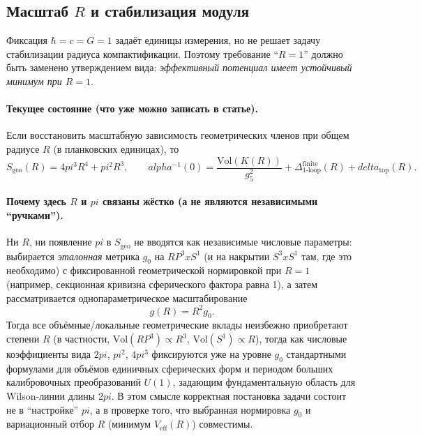 \documentclass[12pt]{article}
\def\mathbb#1{#1}%
\def\alpha{alpha}%
\def\pi{pi}%
\def\delta{delta}%
\def\times{x}%
\begin{document}
\subsection{Масштаб \texorpdfstring{$R$}{R} и стабилизация модуля}
Фиксация $\hbar=c=G=1$ задаёт единицы измерения, но не решает задачу стабилизации радиуса компактификации.
Поэтому требование ``$R=1$'' должно быть заменено утверждением вида: \emph{эффективный потенциал имеет устойчивый минимум при $R=1$}.

\paragraph{Текущее состояние (что уже можно записать в статье).}
Если восстановить масштабную зависимость геометрических членов при общем радиусе $R$ (в планковских единицах), то
\begin{equation}
S_{\mathrm{geo}}(R)=4\pi^3 R^4+\pi^2 R^3,
\qquad
\alpha^{-1}(0)=\frac{\mathrm{Vol}(K(R))}{g_5^2}+\Delta_{\mathrm{1\text{-}loop}}^{\mathrm{finite}}(R)+\delta_{\mathrm{top}}(R).
\end{equation}

\paragraph{Почему здесь \texorpdfstring{$R$}{R} и \texorpdfstring{$\pi$}{pi} связаны жёстко (а не являются независимыми ``ручками'').}
Ни $R$, ни появление $\pi$ в $S_{\mathrm{geo}}$ не вводятся как независимые числовые параметры: выбирается \emph{эталонная} метрика $g_0$ на $\mathbb{RP}^3\times S^1$ (и на накрытии $S^3\times S^1$ там, где это необходимо) с фиксированной геометрической нормировкой при $R=1$ (например, секционная кривизна сферического фактора равна 1), а затем рассматривается однопараметрическое масштабирование
\begin{equation}
 g(R)=R^2 g_0.
\end{equation}
Тогда все объёмные/локальные геометрические вклады неизбежно приобретают степени $R$ (в частности, $\mathrm{Vol}(\mathbb{RP}^3)\propto R^3$, $\mathrm{Vol}(S^1)\propto R$), тогда как числовые коэффициенты вида $2\pi$, $\pi^2$, $4\pi^3$ фиксируются уже на уровне $g_0$ стандартными формулами для объёмов единичных сферических форм и периодом больших калибровочных преобразований $U(1)$, задающим фундаментальную область для Wilson-линии длины $2\pi$.
В этом смысле корректная постановка задачи состоит не в ``настройке'' $\pi$, а в проверке того, что выбранная нормировка $g_0$ и вариационный отбор $R$ (минимум $V_{\mathrm{eff}}(R)$) совместимы.
\end{document}
